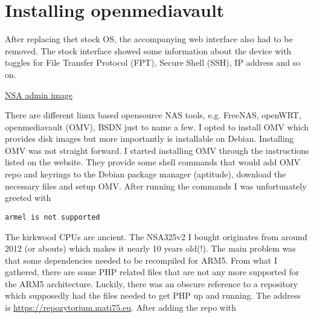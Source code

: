 \documentclass[11pt]{article}
\begin{document}
\section{Installing openmediavault}
\label{sec:org0a5ea09}
After  replacing   thet  stock  OS,  the   accompanying  web
interface also had to be removed. The stock interface showed
some  information about  the  device with  toggles for  File
Transfer Protocol (FPT), Secure  Shell (SSH), IP address and
so on.

\href{./figures/nsa325old.jpg}{NSA admin image}

There are  different linux based opensource  NAS tools, e.g.
FreeNAS, openWRT, openmediavault (OMV), BSDN just to name a few. I
opted to  install OMV which provides  disk images
but more  importantly is  installable on  Debian. Installing
OMV   was  not   straight   forward.  I   started
installing  OMV  through  the  instructions  listed  on  the
website. They provide some shell commands that would add OMV
repo and keyrings to  the Debian package manager (aptitude),
download the  necessary files  and setup OMV.  After running
the commands I was unfortunately greeted with

\begin{verbatim}
armel is not supported
\end{verbatim}

The  kirkwood  CPUs  are  ancient.  The  NSA325v2  I  bought
originates from around 2012 (or  abouts) which makes it nearly
10 years old(!). The main problem was that some dependencies
needed  to be  recompiled for  ARM5. From  what I  gathered,
there  are some  PHP related  files  that are  not any  more
supported for  the ARM5 architecture. Luckily,  there was an
obscure reference  to a repository which  supposedly had the
files  needed to  get PHP  up  and running.  The address  is
\url{https://repozytorium.mati75.eu}. After adding the repo with
\end{document}
